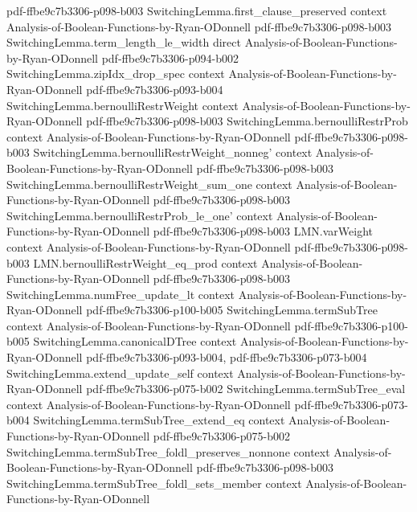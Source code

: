 \begin{lemma}
  {pdf-ffbe9c7b3306-p098-b003}
\proofstep
  {SwitchingLemma.first_clause_preserved}
  {context}
  {Analysis-of-Boolean-Functions-by-Ryan-ODonnell}
  {pdf-ffbe9c7b3306-p098-b003}
\proofstep
  {SwitchingLemma.term_length_le_width}
  {direct}
  {Analysis-of-Boolean-Functions-by-Ryan-ODonnell}
  {pdf-ffbe9c7b3306-p094-b002}
\proofstep
  {SwitchingLemma.zipIdx_drop_spec}
  {context}
  {Analysis-of-Boolean-Functions-by-Ryan-ODonnell}
  {pdf-ffbe9c7b3306-p093-b004}
\proofstep
  {SwitchingLemma.bernoulliRestrWeight}
  {context}
  {Analysis-of-Boolean-Functions-by-Ryan-ODonnell}
  {pdf-ffbe9c7b3306-p098-b003}
\proofstep
  {SwitchingLemma.bernoulliRestrProb}
  {context}
  {Analysis-of-Boolean-Functions-by-Ryan-ODonnell}
  {pdf-ffbe9c7b3306-p098-b003}
\proofstep
  {SwitchingLemma.bernoulliRestrWeight_nonneg'}
  {context}
  {Analysis-of-Boolean-Functions-by-Ryan-ODonnell}
  {pdf-ffbe9c7b3306-p098-b003}
\proofstep
  {SwitchingLemma.bernoulliRestrWeight_sum_one}
  {context}
  {Analysis-of-Boolean-Functions-by-Ryan-ODonnell}
  {pdf-ffbe9c7b3306-p098-b003}
\proofstep
  {SwitchingLemma.bernoulliRestrProb_le_one'}
  {context}
  {Analysis-of-Boolean-Functions-by-Ryan-ODonnell}
  {pdf-ffbe9c7b3306-p098-b003}
\proofstep
  {LMN.varWeight}
  {context}
  {Analysis-of-Boolean-Functions-by-Ryan-ODonnell}
  {pdf-ffbe9c7b3306-p098-b003}
\proofstep
  {LMN.bernoulliRestrWeight_eq_prod}
  {context}
  {Analysis-of-Boolean-Functions-by-Ryan-ODonnell}
  {pdf-ffbe9c7b3306-p098-b003}
\proofstep
  {SwitchingLemma.numFree_update_lt}
  {context}
  {Analysis-of-Boolean-Functions-by-Ryan-ODonnell}
  {pdf-ffbe9c7b3306-p100-b005}
\proofstep
  {SwitchingLemma.termSubTree}
  {context}
  {Analysis-of-Boolean-Functions-by-Ryan-ODonnell}
  {pdf-ffbe9c7b3306-p100-b005}
\proofstep
  {SwitchingLemma.canonicalDTree}
  {context}
  {Analysis-of-Boolean-Functions-by-Ryan-ODonnell}
  {pdf-ffbe9c7b3306-p093-b004,
    pdf-ffbe9c7b3306-p073-b004}
\proofstep
  {SwitchingLemma.extend_update_self}
  {context}
  {Analysis-of-Boolean-Functions-by-Ryan-ODonnell}
  {pdf-ffbe9c7b3306-p075-b002}
\proofstep
  {SwitchingLemma.termSubTree_eval}
  {context}
  {Analysis-of-Boolean-Functions-by-Ryan-ODonnell}
  {pdf-ffbe9c7b3306-p073-b004}
\proofstep
  {SwitchingLemma.termSubTree_extend_eq}
  {context}
  {Analysis-of-Boolean-Functions-by-Ryan-ODonnell}
  {pdf-ffbe9c7b3306-p075-b002}
\proofstep
  {SwitchingLemma.termSubTree_foldl_preserves_nonnone}
  {context}
  {Analysis-of-Boolean-Functions-by-Ryan-ODonnell}
  {pdf-ffbe9c7b3306-p098-b003}
\proofstep
  {SwitchingLemma.termSubTree_foldl_sets_member}
  {context}
  {Analysis-of-Boolean-Functions-by-Ryan-ODonnell}

\end{lemma}
